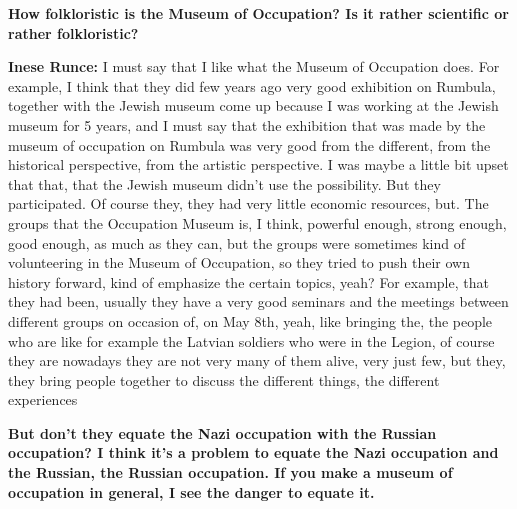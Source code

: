 \textbf{How folkloristic is the Museum of Occupation? Is it rather scientific or rather folkloristic?}

\textbf{Inese Runce:} I must say that I like what the Museum of Occupation does. For example, I think that they did few years ago very good exhibition on Rumbula, together with the Jewish museum come up because I was working at the Jewish museum for 5 years, and I must say that the exhibition that was made by the museum of occupation on Rumbula was very good from the different, from the historical perspective, from the artistic perspective. I was maybe a little bit upset that that, that the Jewish museum didn’t use the possibility. But they participated. Of course they, they had very little economic resources, but. The groups that the Occupation Museum is, I think, powerful enough, strong enough,  good enough, as much as they can, but the groups were sometimes kind of volunteering in the Museum of Occupation, so they tried to push their own history forward, kind of emphasize the certain topics, yeah? For example, that they had been, usually they have a very good seminars and the meetings between different groups on occasion of, on May 8th, yeah, like bringing the, the people who are like for example the Latvian soldiers who were in the Legion, of course they are nowadays they are not very many of them alive, very just few, but they, they bring people together to discuss the different things, the different experiences

\textbf{But don't they equate the Nazi occupation with the Russian occupation? I think it's a problem to equate the Nazi occupation and the Russian, the Russian occupation. If you make a museum of occupation in general, I see the danger to equate it.} 
 
